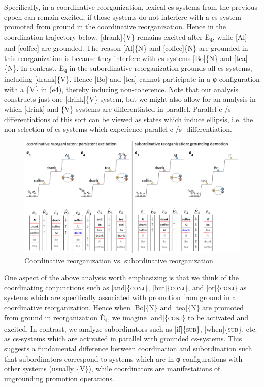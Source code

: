   Specifically, in a coordinative reorganization, lexical cs-systems from the previous epoch can remain excited, if those systems do not interfere with a cs-system promoted from ground in the coordinative reorganization. Hence in the coordination trajectory below, [drank]\{V\} remains excited after Ê\textsubscript{4}, while [Al] and [coffee] are grounded. The reason [Al]\{N\} and [coffee]\{N\} are grounded in this reorganization is because they interfere with cs-systems [Bo]\{N\} and [tea]\{N\}. In contrast, Ê\textsubscript{4} in the subordinative reorganization grounds all cs-systems, including [drank]\{V\}. Hence [Bo] and [tea] cannot participate in a φ configuration with a \{V\} in (e4), thereby inducing non-coherence. Note that our analysis constructs just one [drink]\{V\} system, but we might also allow for an analysis in which [drink] and \{V\} systems are differentiated in parallel. Parallel c-/s- differentiations of this sort can be viewed as states which induce ellipsis, i.e. the non-selection of cs-systems which experience parallel c-/s- differentiation.

  
\begin{figure}
\includegraphics[width=\textwidth]{figures/Tilsen-img146.png}
\caption{Coordinative reorganization vs. subordinative reorganization.}
\label{fig:7:2}
\end{figure}
 

  One aspect of the above analysis worth emphasizing is that we think of the coordinating conjunctions such as [and]\{\textsc{conj}\}, [but]\{\textsc{conj}\}, and [or]\{\textsc{conj}\} as systems which are specifically associated with promotion from ground in a coordinative reorganization. Hence when [Bo]\{N\} and [tea]\{N\} are promoted from ground in reorganization Ê\textsubscript{4}, we imagine [and]\{\textsc{conj}\} to be activated and excited. In contrast, we analyze subordinators such as [if]\{\textsc{sub}\}, [when]\{\textsc{sub}\}, etc. as cs-systems which are activated in parallel with grounded cs-systems. This suggests a fundamental difference between coordination and subordination such that subordinators correspond to systems which are in φ configurations with other systems (usually \{V\}), while coordinators are manifestations of ungrounding promotion operations.

